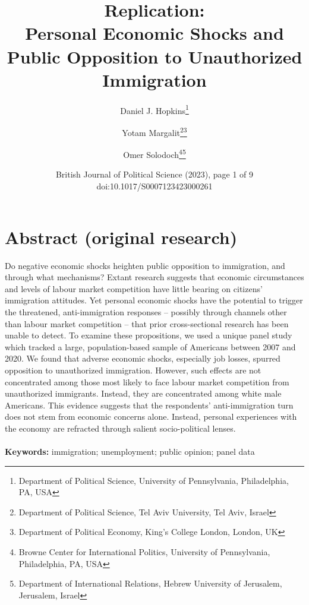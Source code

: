 \documentclass[12pt,letterpaper]{article}
\title{\textbf{Replication:} \\Personal Economic Shocks and Public Opposition to Unauthorized Immigration}
\author{Daniel J. Hopkins\thanks{Department of Political Science, University of Pennsylvania, Philadelphia, PA, USA} \and Yotam Margalit\thanks{Department of Political Science, Tel Aviv University, Tel Aviv, Israel}\thanks{Department of Political Economy, King’s College London, London, UK} \and Omer Solodoch\thanks{Browne Center for International Politics, University of Pennsylvania, Philadelphia, PA, USA}\thanks{Department of International Relations, Hebrew University of Jerusalem, Jerusalem, Israel}}
\date{\small British Journal of Political Science (2023), page 1 of 9 \\
	doi:10.1017/S0007123423000261}
\begin{document}
\maketitle

\section*{Abstract (original research)}

Do negative economic shocks heighten public opposition to immigration, and through what mechanisms? Extant research suggests that economic circumstances and levels of labour market competition have little bearing on citizens’ immigration attitudes. Yet personal economic shocks have the potential to trigger the threatened, anti-immigration responses – possibly through channels other than labour market competition – that prior cross-sectional research has been unable to detect. To examine these propositions, we used a unique panel study which tracked a large, population-based sample of Americans between 2007 and 2020. We found that adverse economic shocks, especially job losses, spurred opposition to unauthorized immigration. However, such effects are not concentrated among those most likely to face labour market competition from unauthorized immigrants. Instead, they are concentrated among white male Americans. This evidence suggests that the respondents’ anti-immigration turn does not stem from economic concerns alone. Instead, personal experiences with the economy are refracted through salient socio-political lenses.\\
\\\textbf{Keywords:} immigration; unemployment; public opinion; panel data

\pagebreak
\end{document}
